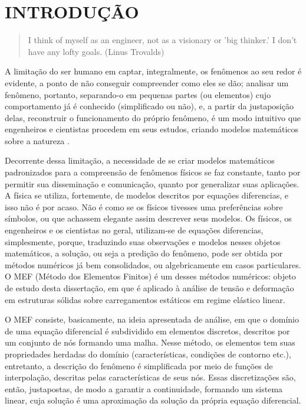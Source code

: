 

\chapter{INTRODUÇÃO}

\begin{quote}
    I think of myself as an engineer, not as a visionary or 'big thinker.' I don't have any lofty goals.
    (Linus Trovalds)  
\end{quote}

A limitação do ser humano em captar, integralmente, os fenômenos ao seu redor é evidente, a ponto de não conseguir compreender como eles se dão; analisar um fenômeno, portanto, separando-o em pequenas partes (ou elementos) cujo comportamento já é conhecido (simplificado ou não), e, a partir da justaposição delas, reconstruir o funcionamento do próprio fenômeno, é um modo intuitivo que engenheiros e cientistas procedem em seus estudos, criando modelos matemáticos sobre a natureza \cite[p. 2]{Zin}.

Decorrente dessa limitação, a necessidade de se criar modelos matemáticos padronizados para a compreensão de fenômenos físicos se faz constante, tanto por permitir sua disseminação e comunicação, quanto por generalizar suas aplicações. A física se utiliza, fortemente, de modelos descritos por equações diferencias, e isso não é por acaso. Não é como se os físicos tivesses uma preferências sobre símbolos, ou que achassem elegante assim descrever seus modelos. Os físicos, os engenheiros e os cientistas no geral, utilizam-se de equações diferencias, simplesmente, porque, traduzindo suas observações e modelos nesses objetos matemáticos, a solução, ou seja a predição do fenômeno, pode ser obtida por métodos numéricos já bem consolidados, ou algebricamente em casos particulares. O MEF (Método dos Elementos Finitos) é um desses métodos numéricos: objeto de estudo desta dissertação, em que é aplicado à análise de tensão e deformação em estruturas sólidas sobre carregamentos estáticos em regime elástico linear.

O MEF consiste, basicamente, na ideia apresentada de análise, em que o domínio de uma equação diferencial é subdividido em elementos discretos, descritos por um conjunto de nós formando uma malha. Nesse método, os elementos tem suas propriedades herdadas do domínio (características, condições de contorno etc.), entretanto, a descrição do fenômeno é simplificada por meio de funções de interpolação, descritas pelas características de seus nós. Essas discretizações são, então, justapostas, de modo a garantir a continuidade, formando um sistema linear, cuja solução é uma aproximação da solução da própria equação diferencial. 

